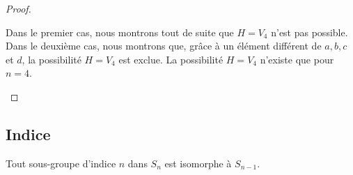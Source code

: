 \begin{proof}
\begin{subproof}
\begin{subproof}
			\spitem[Pourquoi \( n=4\) est spécial ?]

			Dans le premier cas, nous montrons tout de suite que \( H=V_4\) n'est pas possible. Dans le deuxième cas, nous montrons que, grâce à un élément différent de \( a,b,c\) et \( d\), la possibilité \( H=V_4\) est exclue. La possibilité \( H=V_4\) n'existe que pour \( n=4\).

		\end{subproof}
	\end{subproof}

\end{proof}

\subsection{Indice}

\begin{theorem}     \label{THOooXDRNooIyaGlv}
    Tout sous-groupe d'indice \( n\) dans \( S_n\) est isomorphe à \( S_{n-1}\).
\end{theorem}


